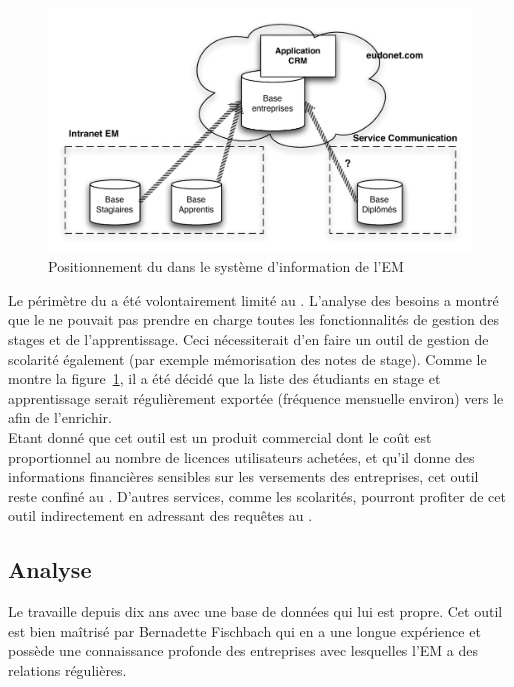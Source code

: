\documentclass{book}
\begin{document}
\begin{figure}[hbt]
\begin{center}
\includegraphics[width=.9\linewidth]{figs/crm_overview.pdf}
\end{center}
\caption{Positionnement du  dans le système d'information de l'EM}
\label{fg:crm_overview}
\end{figure}

Le périmètre du   a été volontairement limité au \sre. L'analyse 
des besoins a montré que le  ne pouvait pas prendre en charge 
toutes les fonctionnalités de gestion des stages et de l'apprentissage. 
Ceci nécessiterait d'en faire un outil de gestion de scolarité également
(par exemple mémorisation des notes de stage). Comme le montre la 
figure~\ref{fg:crm_overview}, il a été décidé que la liste des étudiants 
en stage et apprentissage serait régulièrement exportée (fréquence 
mensuelle environ) vers le  afin de l'enrichir.\\

Etant donné que cet outil est un produit commercial dont le coût est
proportionnel au nombre de licences utilisateurs achetées, et qu'il
donne des informations financières sensibles sur les versements des
entreprises, cet outil reste confiné au \sre. D'autres services, comme
les scolarités, pourront profiter de cet outil indirectement en adressant
des requêtes au \sre.

\subsection{Analyse}
Le \sre travaille depuis dix ans avec une base de données qui lui est
propre. Cet outil est bien maîtrisé par Bernadette Fischbach qui en
a une longue expérience et possède une connaissance profonde des 
entreprises avec lesquelles l'EM a des relations régulières. \\
\end{document}
